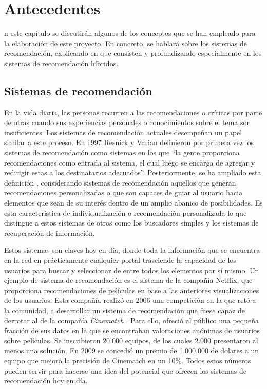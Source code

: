 \chapter{Antecedentes}
\label{chap:antecedentes}

\noindent
{}n este capítulo se discutirán algunos de los conceptos que se han empleado para la elaboración de este proyecto. En concreto, se hablará sobre los sistemas de recomendación, explicando en que consisten y profundizando especialmente en los sistemas de recomendación híbridos. 

\section{Sistemas de recomendación}
En la vida diaria, las personas recurren a las recomendaciones o críticas por parte de otras cuando sus experiencias personales o conocimientos sobre el tema son insuficientes.  Los sistemas de recomendación actuales desempeñan un papel similar a este proceso. En 1997 Resnick y Varian \cite{Resnick:1997:RS:245108.245121} definieron por primera vez los sistemas de recomendación como sistemas en los que ``la gente proporciona recomendaciones como entrada al sistema, el cual luego se encarga de agregar y redirigir estas a los destinatarios adecuados''. %
Posteriormente, se ha ampliado esta definición \cite{Burke}, considerando sistemas de recomendación aquellos que generan recomendaciones personalizadas o que son capaces de guiar al usuario hacia elementos que sean de su interés dentro de un amplio abanico de posibilidades. Es esta característica de individualización o recomendación personalizada lo que distingue a estos sistemas de otros como los buscadores simples y los sistemas de recuperación de información.

Estos sistemas son claves hoy en día, donde toda la información que se encuentra en la red en prácticamente cualquier portal trasciende la capacidad de los usuarios para buscar y seleccionar de entre todos los elementos por sí mismo. Un ejemplo de sistema de recomendación es el sistema de la compañía Netflix, que proporciona recomendaciones de películas en base a las anteriores visualizaciones de los usuarios. Esta compañía realizó en 2006 una competición en la que retó a la comunidad, a desarrollar un sistema de recomendación que fuese capaz de derrotar al de la compañía \textit{Cinematch} \cite{Bennett:2007}. Para ello, ofreció al público una pequeña fracción de sus datos en la que se encontraban valoraciones anónimas de usuarios sobre películas. Se inscribieron 20.000 equipos, de los cuales 2.000 presentaron al menos una solución. En 2009 se concedió un premio de 1.000.000 de dolares a un equipo que mejoró la precisión de Cinematch en un 10\%. Todos estos números pueden servir para hacerse una idea del potencial que ofrecen los sistemas de recomendación hoy en día.

